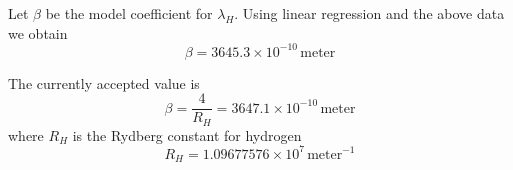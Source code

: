 \documentclass[12pt]{article}
\begin{document}
\noindent
Let $\beta$ be the model coefficient for $\lambda_H$.
Using linear regression and the above data we obtain
\begin{equation*}
\beta=3645.3\times10^{-10}\,\text{meter}
\end{equation*}

%
%
%
%
%

\noindent
The currently accepted value is
\begin{equation*}
\beta=\frac{4}{R_H}=3647.1\times10^{-10}\,\text{meter}
\end{equation*}
where $R_H$ is the Rydberg constant for hydrogen
\begin{equation*}
R_H=1.09677576\times10^7\,\text{meter}^{-1}
\end{equation*}
\end{document}
